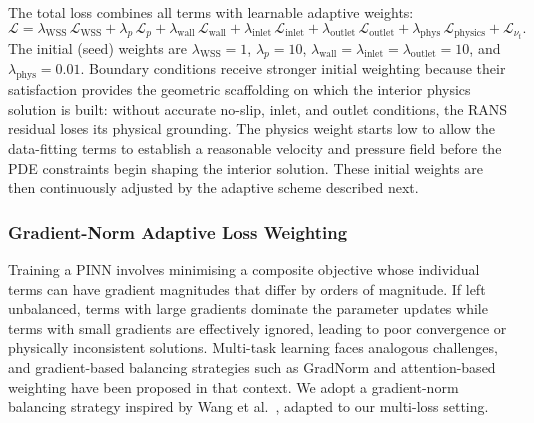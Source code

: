 \documentclass[11pt,a4paper]{article}
\begin{document}
The total loss combines all terms with learnable adaptive weights:
\begin{equation}
\mathcal{L} = \lambda_{\text{WSS}}\,\mathcal{L}_{\text{WSS}} + \lambda_p\,\mathcal{L}_p + \lambda_{\text{wall}}\,\mathcal{L}_{\text{wall}} + \lambda_{\text{inlet}}\,\mathcal{L}_{\text{inlet}} + \lambda_{\text{outlet}}\,\mathcal{L}_{\text{outlet}} + \lambda_{\text{phys}}\,\mathcal{L}_{\text{physics}} + \mathcal{L}_{\nu_t}.
\label{eq:total_loss}
\end{equation}
The initial (seed) weights are $\lambda_{\text{WSS}} = 1$, $\lambda_p = 10$, $\lambda_{\text{wall}} = \lambda_{\text{inlet}} = \lambda_{\text{outlet}} = 10$, and $\lambda_{\text{phys}} = 0.01$. Boundary conditions receive stronger initial weighting because their satisfaction provides the geometric scaffolding on which the interior physics solution is built: without accurate no-slip, inlet, and outlet conditions, the RANS residual loses its physical grounding. The physics weight starts low to allow the data-fitting terms to establish a reasonable velocity and pressure field before the PDE constraints begin shaping the interior solution. These initial weights are then continuously adjusted by the adaptive scheme described next.

\subsubsection{Gradient-Norm Adaptive Loss Weighting}
\label{sec:adaptive_weights}

Training a PINN involves minimising a composite objective whose individual terms can have gradient magnitudes that differ by orders of magnitude. If left unbalanced, terms with large gradients dominate the parameter updates while terms with small gradients are effectively ignored, leading to poor convergence or physically inconsistent solutions. Multi-task learning faces analogous challenges, and gradient-based balancing strategies such as GradNorm \cite{ref16} and attention-based weighting \cite{ref17} have been proposed in that context. We adopt a gradient-norm balancing strategy inspired by Wang et al.\ \cite{ref_wang2021}, adapted to our multi-loss setting.
\end{document}
